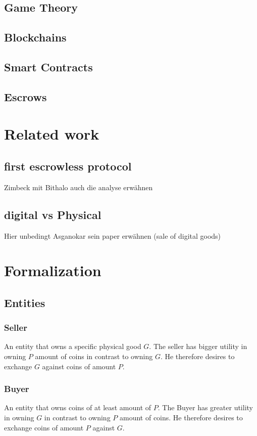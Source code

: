 \documentclass{cacthesis}
\begin{document}
\section{Game Theory}
\section{Blockchains}
\section{Smart Contracts}
\section{Escrows}

\chapter{Related work}
\section{first escrowless protocol}
Zimbeck mit Bithalo
auch die analyse erwähnen
\section{digital vs Physical}
Hier unbedingt Asganokar sein paper erwähnen (sale of digital goods)

\chapter{Formalization}
\section{Entities}

\subsection{Seller}An entity that owns a specific physical good $G$. The seller has bigger utility in owning $P$ amount of coins in contrast to owning $G$. He therefore desires to exchange $G$ against coins of amount $P$.


\subsection{Buyer}An entity that owns coins of at least amount of $P$. The Buyer has greater utility in owning $G$ in contrast to  owning $P$ amount of coins. He therefore desires to exchange coins of amount $P$ against $G$.
\end{document}
